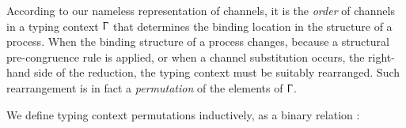 According to our nameless representation of channels, it is the \emph{order} of
channels in a typing context $\Upgamma$ that determines the binding location in
the structure of a process. When the binding structure of a process changes, \eg
because a structural pre-congruence rule is applied, or when a channel
substitution occurs, \cf the right-hand side of the \LinkRule reduction, the
typing context must be suitably rearranged. Such rearrangement is in fact a
\emph{permutation} of the elements of $\Upgamma$.

We define typing context permutations inductively, as a binary relation
\AgdaDatatype{\_\#\_}:

\begin{code}%
\>[0]\AgdaSpace{}%
\AgdaOperator{\AgdaDatatype{\AgdaUnderscore{}\#\AgdaUnderscore{}}}\AgdaSpace{}%
\AgdaSymbol{:}\AgdaSpace{}%
\AgdaSpace{}%
\AgdaSpace{}%
\AgdaSpace{}%
\AgdaSpace{}%
\AgdaSpace{}%
\<%
\\
\>[0][@{}l@{\AgdaIndent{0}}]%
\>[2]%
\>[9]\AgdaSymbol{:}\AgdaSpace{}%
\AgdaSymbol{\}}\AgdaSpace{}%
\AgdaSpace{}%
\AgdaSpace{}%
\AgdaOperator{\AgdaDatatype{\#}}\AgdaSpace{}%
\<%
\\
%
\>[2]%
\>[9]\AgdaSymbol{:}\AgdaSpace{}%
\AgdaSpace{}%
\AgdaSpace{}%
\AgdaSymbol{\}}\AgdaSpace{}%
\AgdaSpace{}%
\AgdaSymbol{(}\AgdaSpace{}%
\AgdaSpace{}%
\AgdaSpace{}%
\AgdaSpace{}%
\AgdaSymbol{)}\AgdaSpace{}%
\AgdaOperator{\AgdaDatatype{\#}}\AgdaSpace{}%
\AgdaSymbol{(}\AgdaSpace{}%
\AgdaSpace{}%
\AgdaSpace{}%
\AgdaSpace{}%
\AgdaSymbol{)}\<%
\\
%
\>[2]%
\>[9]\AgdaSymbol{:}\AgdaSpace{}%
\AgdaSpace{}%
\AgdaSpace{}%
\AgdaSymbol{\}}\AgdaSpace{}%
\AgdaSpace{}%
\AgdaSpace{}%
\AgdaOperator{\AgdaDatatype{\#}}\AgdaSpace{}%
\AgdaSpace{}%
\AgdaSpace{}%
\AgdaSymbol{(}\AgdaSpace{}%
\AgdaSpace{}%

\end{code}
